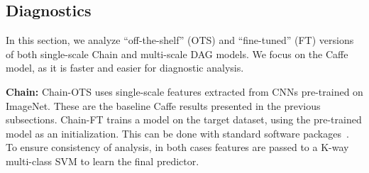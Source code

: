 \documentclass[10pt,twocolumn,letterpaper]{article}
\begin{document}





\subsection{Diagnostics \label{sec:diag}}
In this section, we analyze ``off-the-shelf'' (OTS) and ``fine-tuned'' (FT) versions of both single-scale Chain and multi-scale DAG models. We focus on the Caffe model, as it is faster and easier for diagnostic analysis. 

{\bf Chain:} Chain-OTS uses single-scale features extracted from CNNs pre-trained on ImageNet. These are the baseline Caffe results presented in the previous subsections. Chain-FT trains a model on the target dataset, using the pre-trained model as an initialization. This can be done with standard software packages~\cite{vedaldimatconvnet}. To ensure consistency of analysis, in both cases features are passed to a K-way multi-class SVM to learn the final predictor. %
\end{document}
